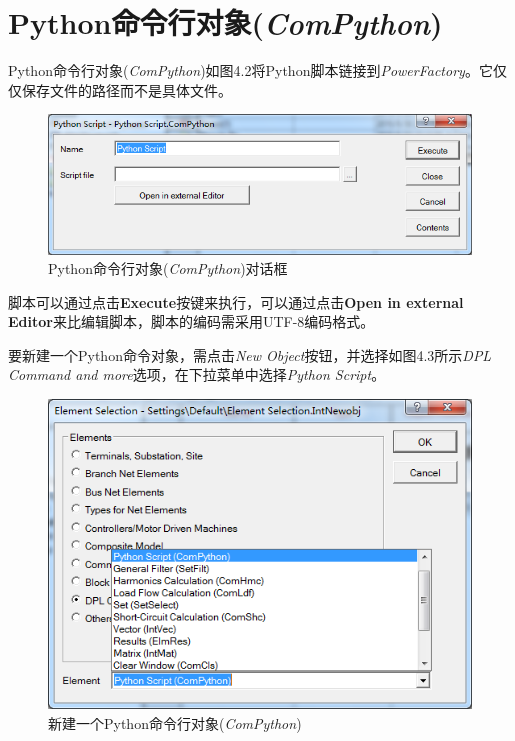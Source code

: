 \section{Python命令行对象(\emph{ComPython})}

Python命令行对象(\emph{ComPython})如图4.2将Python脚本链接到\emph{PowerFactory}。它仅仅保存文件的路径而不是具体文件。

\begin{figure}[H]
\centering
\includegraphics[width=1.05\textwidth]{images/Paper_Fig_15.png}
\setcaptionwidth{\linewidth}
\caption{Python命令行对象(\emph{ComPython})对话框}
\end{figure}

脚本可以通过点击\textbf{Execute}按键来执行，可以通过点击\textbf{Open in external Editor}来比编辑脚本，脚本的编码需采用UTF-8编码格式。

要新建一个Python命令对象，需点击\emph{New Object}按钮，并选择如图4.3所示\emph{DPL Command and more}选项，在下拉菜单中选择\emph{Python Script}。

\begin{figure}[H]
\centering
\includegraphics[width=1.05\textwidth]{images/Paper_Fig_14.png}
\setcaptionwidth{\linewidth}
\caption{新建一个Python命令行对象(\emph{ComPython})}
\end{figure}

